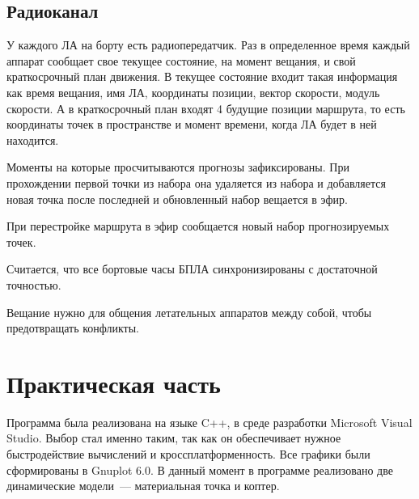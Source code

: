 \documentclass[a4paper,12pt]{article}
\begin{document}

\subsection{Радиоканал}
У каждого ЛА на борту есть радиопередатчик. Раз в определенное время каждый аппарат сообщает свое текущее состояние, на момент вещания, и свой краткосрочный план движения. В текущее состояние входит такая информация как время вещания, имя ЛА, координаты позиции, вектор скорости, модуль скорости. А в краткосрочный план входят 4 будущие позиции маршрута, то есть координаты точек в пространстве и момент времени, когда ЛА будет в ней находится. 

Моменты на которые просчитываются прогнозы зафиксированы. При прохождении первой точки из набора она удаляется из набора и добавляется новая точка после последней и обновленный набор вещается в эфир.

При перестройке маршрута в эфир сообщается новый набор прогнозируемых точек.

Считается, что все бортовые часы БПЛА синхронизированы с достаточной точностью.

Вещание нужно для общения летательных аппаратов между собой, чтобы предотвращать конфликты.


\newpage
\section{Практическая часть}
Программа была реализована на языке C++, в среде разработки Microsoft Visual Studio. Выбор стал именно таким, так как он обеспечивает нужное быстродействие вычислений и кроссплатформенность. Все графики были сформированы в Gnuplot 6.0. В данный момент в программе реализовано две динамические модели~--- материальная точка и коптер. 
\end{document}
